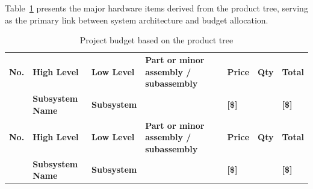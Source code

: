 Table~\ref{tab:product_tree_budget} presents the major hardware items derived from the product tree,
serving as the primary link between system architecture and budget allocation.

{\small
\begin{longtable}{@{}p{0.7cm}p{1.8cm}p{2.5cm}p{4.2cm}p{1.1cm}p{0.9cm}p{1.3cm}@{}}
\caption{Project budget based on the product tree}
\label{tab:product_tree_budget} \\

\toprule
\textbf{No.} &
\textbf{High Level} &
\textbf{Low Level} &
\textbf{Part or minor assembly / subassembly} &
\centering\textbf{Price} &
\centering\textbf{Qty} &
\centering\textbf{Total} \tabularnewline
&
\textbf{Subsystem Name} &
\textbf{Subsystem} &
&
\centering\textbf{[\$]} &
&
\centering\textbf{[\$]} \tabularnewline
\midrule
\endfirsthead

\toprule
\textbf{No.} &
\textbf{High Level} &
\textbf{Low Level} &
\textbf{Part or minor assembly / subassembly} &
\centering\textbf{Price} &
\centering\textbf{Qty} &
\centering\textbf{Total} \tabularnewline
&
\textbf{Subsystem Name} &
\textbf{Subsystem} &
&
\centering\textbf{[\$]} &
&
\centering\textbf{[\$]} \tabularnewline
\midrule
\endhead


\end{longtable}}
